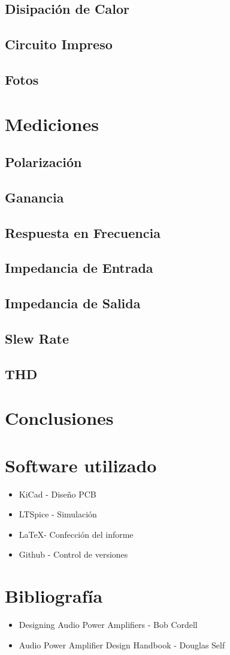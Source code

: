 \documentclass[a4paper,12pt,twoside]{article}
\begin{document}
\subsection{Disipación de Calor}
\subsection{Circuito Impreso }
\subsection{Fotos}

\newpage
\section{Mediciones}
\subsection{Polarización}
\subsection{Ganancia}
\subsection{Respuesta en Frecuencia}
\subsection{Impedancia de Entrada}
\subsection{Impedancia de Salida}
\subsection{Slew Rate}
\subsection{THD}

\newpage

\section{Conclusiones}

\section{Software utilizado}
\begin{itemize}
\item KiCad - Diseño PCB
\item LTSpice - Simulación
\item \LaTeX - Confección del informe
\item Github - Control de versiones
\end{itemize}
\section{Bibliografía}

\begin{itemize}
\item Designing Audio Power Amplifiers - Bob Cordell
\item Audio Power Amplifier Design Handbook - Douglas Self 

\end{itemize}
\end{document}
